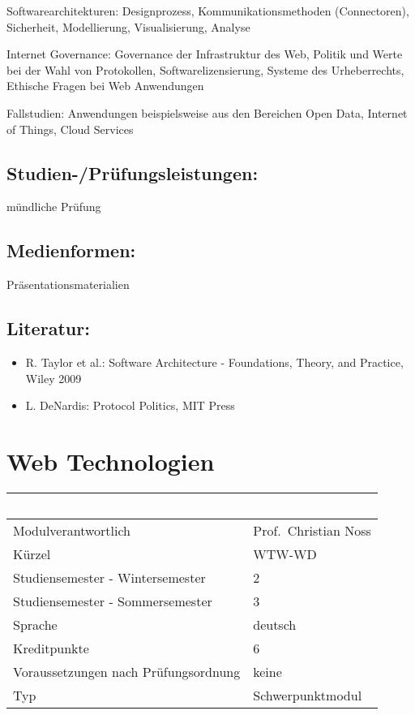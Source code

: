 Softwarearchitekturen: Designprozess, Kommunikationsmethoden
(Connectoren), Sicherheit, Modellierung, Visualisierung, Analyse

Internet Governance: Governance der Infrastruktur des Web, Politik und
Werte bei der Wahl von Protokollen, Softwarelizensierung, Systeme des
Urheberrechts, Ethische Fragen bei Web Anwendungen

Fallstudien: Anwendungen beispielsweise aus den Bereichen Open Data,
Internet of Things, Cloud Services

\section*{Studien-/Prüfungsleistungen:}\label{studien-pruxfcfungsleistungen-22}

mündliche Prüfung

\section*{Medienformen:}\label{medienformen-22}

Präsentationsmaterialien

\section*{Literatur:}\label{literatur-19}

\begin{itemize}
\item
  R. Taylor et al.: Software Architecture - Foundations, Theory, and
  Practice, Wiley 2009
\item
  L. DeNardis: Protocol Politics, MIT Press
\end{itemize}

\chapter{Web Technologien}\label{web-technologien}

\begin{longtable}[]{@{}ll@{}}
\toprule
~ & ~\tabularnewline
\midrule
\endhead
Modulverantwortlich & Prof.~Christian Noss\tabularnewline
Kürzel & WTW-WD\tabularnewline
Studiensemester - Wintersemester & 2\tabularnewline
Studiensemester - Sommersemester & 3\tabularnewline
Sprache & deutsch\tabularnewline
Kreditpunkte & 6\tabularnewline
Voraussetzungen nach Prüfungsordnung & keine\tabularnewline
Typ & Schwerpunktmodul\tabularnewline
\bottomrule
\end{longtable}

